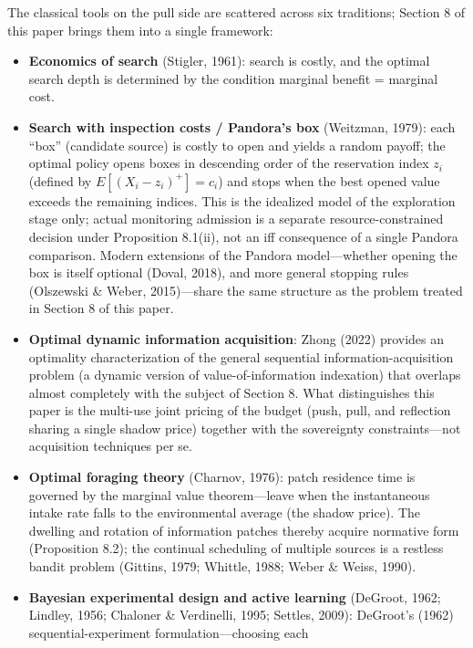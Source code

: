 \documentclass[
  11pt]{article}
\providecommand{\tightlist}{%
  \setlength{\itemsep}{0pt}\setlength{\parskip}{0pt}}
\begin{document}
The classical tools on the pull side are scattered across six
traditions; Section 8 of this paper brings them into a single framework:

\begin{itemize}
\tightlist
\item
  \textbf{Economics of search} (Stigler, 1961): search is costly, and
  the optimal search depth is determined by the condition marginal
  benefit = marginal cost.
\item
  \textbf{Search with inspection costs / Pandora's box} (Weitzman,
  1979): each ``box'' (candidate source) is costly to open and yields a
  random payoff; the optimal policy opens boxes in descending order of
  the reservation index \(z_i\) (defined by \(E[(X_i - z_i)^+] = c_i\))
  and stops when the best opened value exceeds the remaining indices.
  This is the idealized model of the exploration stage only; actual
  monitoring admission is a separate resource-constrained decision under
  Proposition 8.1(ii), not an iff consequence of a single Pandora
  comparison. Modern extensions of the Pandora model---whether opening
  the box is itself optional (Doval, 2018), and more general stopping
  rules (Olszewski \& Weber, 2015)---share the same structure as the
  problem treated in Section 8 of this paper.
\item
  \textbf{Optimal dynamic information acquisition}: Zhong (2022)
  provides an optimality characterization of the general sequential
  information-acquisition problem (a dynamic version of
  value-of-information indexation) that overlaps almost completely with
  the subject of Section 8. What distinguishes this paper is the
  multi-use joint pricing of the budget (push, pull, and reflection
  sharing a single shadow price) together with the sovereignty
  constraints---not acquisition techniques per se.
\item
  \textbf{Optimal foraging theory} (Charnov, 1976): patch residence time
  is governed by the marginal value theorem---leave when the
  instantaneous intake rate falls to the environmental average (the
  shadow price). The dwelling and rotation of information patches
  thereby acquire normative form (Proposition 8.2); the continual
  scheduling of multiple sources is a restless bandit problem (Gittins,
  1979; Whittle, 1988; Weber \& Weiss, 1990).
\item
  \textbf{Bayesian experimental design and active learning} (DeGroot,
  1962; Lindley, 1956; Chaloner \& Verdinelli, 1995; Settles, 2009):
  DeGroot's (1962) sequential-experiment formulation---choosing each

\end{itemize}
\end{document}
